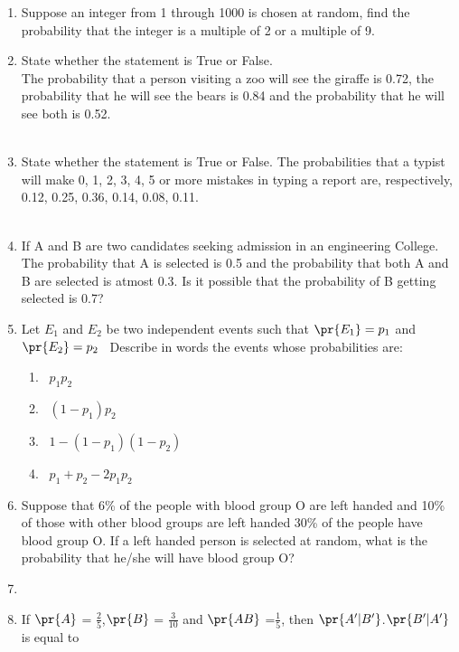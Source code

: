 \begin{enumerate}[label=\thesection.\arabic*,ref=\thesection.\theenumi]
\item Suppose an integer from 1 through 1000 is chosen at random, find the probability that the integer is a multiple of 2 or a multiple of 9.
%
\item State whether the statement is True or False.\\
The probability that a person visiting a zoo will see the giraffe is 0.72, the probability that he will see the bears is 0.84 and the probability that he will see both is 0.52.\\
\solution
\\
%
\item State whether the statement is True or False. The probabilities that a typist will make 0, 1, 2, 3, 4, 5 or more mistakes in typing a report are, respectively, 0.12, 0.25, 0.36, 0.14, 0.08, 0.11.\\
\solution
\\
%
\item If A and B are two candidates seeking admission in an engineering College. The probability that A is selected is 0.5 and the probability that both A and B are selected is atmost 0.3. Is it possible that the probability of B getting selected is 0.7?\\
%
\item Let $E_1$ and $E_2$ be two independent events such that $\pr{E_1} = p_1 $ and $ \pr{E_2} = p_2 $ \ Describe in words the events whose probabilities are: 
\begin{enumerate}
\item \ $p_1 p_2$
\quad\item \ $(1 - p_1) p_2 $
\quad\item \ $1 - (1 - p_1)(1 - p_2)$
\quad\item \ $p_1 + p_2 - 2p_1 p_2$
\end{enumerate}
%
\item Suppose that 6\% of the people with blood group O are left handed and 10\% of those with other blood groups are left handed 30\% of the people have blood group O. If a left handed person is selected at random, what is the probability that he/she will have blood group O?
%
\item %
\item If $\pr{A}$ = $\frac{2}{5}$,$\pr{B}$ = $\frac{3}{10}$ and $\pr{AB}$ =$ \frac{1}{5}$, then $\pr{A^{\prime}|B^{\prime}}$.$\pr{B^{\prime}|A^{\prime}}$ is equal to \\

\end{enumerate}

